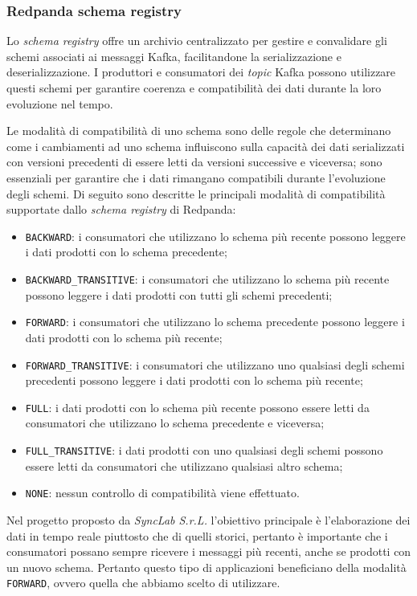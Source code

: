 \subsubsection{Redpanda schema registry}
Lo \textit{schema registry} offre un archivio centralizzato per gestire e convalidare gli schemi associati ai messaggi Kafka, facilitandone la serializzazione e deserializzazione.
I produttori e consumatori dei \textit{topic} Kafka possono utilizzare questi schemi per garantire coerenza e compatibilità dei dati durante la loro evoluzione nel tempo.

Le modalità di compatibilità di uno schema sono delle regole che determinano come i cambiamenti ad uno schema influiscono sulla capacità dei dati serializzati con
versioni precedenti di essere letti da versioni successive e viceversa; sono essenziali per garantire che i dati rimangano compatibili durante l'evoluzione degli schemi.
Di seguito sono descritte le principali modalità di compatibilità supportate dallo \textit{schema registry} di Redpanda:

\begin{itemize}
	\item \texttt{BACKWARD}: i consumatori che utilizzano lo schema più recente possono leggere i dati prodotti con lo schema precedente;
	\item \texttt{BACKWARD\_TRANSITIVE}: i consumatori che utilizzano lo schema più recente possono leggere i dati prodotti con tutti gli schemi precedenti;
	\item \texttt{FORWARD}: i consumatori che utilizzano lo schema precedente possono leggere i dati prodotti con lo schema più recente;
	\item \texttt{FORWARD\_TRANSITIVE}: i consumatori che utilizzano uno qualsiasi degli schemi precedenti possono leggere i dati prodotti con lo schema più recente;
	\item \texttt{FULL}: i dati prodotti con lo schema più recente possono essere letti da consumatori che utilizzano lo schema precedente e viceversa;
	\item \texttt{FULL\_TRANSITIVE}: i dati prodotti con uno qualsiasi degli schemi possono essere letti da consumatori che utilizzano qualsiasi altro schema;
	\item \texttt{NONE}: nessun controllo di compatibilità viene effettuato.
\end{itemize}
Nel progetto proposto da \textit{SyncLab S.r.L.} l'obiettivo principale è l'elaborazione dei dati in tempo reale piuttosto che di quelli storici, pertanto
è importante che i consumatori possano sempre ricevere i messaggi più recenti, anche se prodotti con un nuovo schema. Pertanto questo tipo di applicazioni beneficiano
della modalità \texttt{FORWARD}, ovvero quella che abbiamo scelto di utilizzare.

